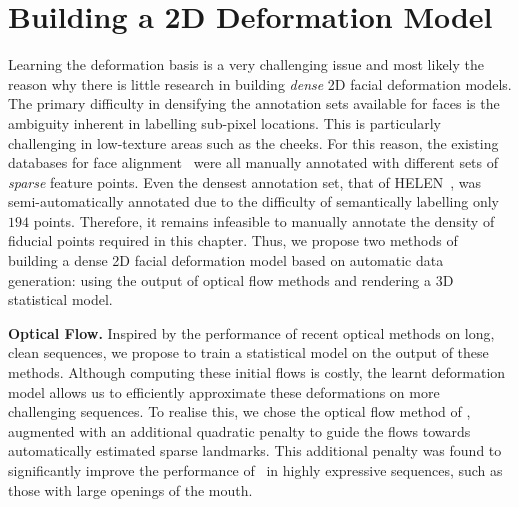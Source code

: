 \section{Building a 2D Deformation Model}\label{sec:face_flow_learning_deformation}
Learning the deformation basis is a very challenging issue and most likely the reason
why there is little research in building \textit{dense} 2D facial deformation models.
The primary difficulty in densifying the annotation sets available for faces
is the ambiguity inherent in labelling sub-pixel locations. This is particularly
challenging in low-texture areas such as the cheeks. For this reason, the 
existing databases for face alignment~\cite{sagonas2013300,zhu2012face,%
belhumeur2013localizing,le2012interactive} were all manually annotated with
different sets of \textit{sparse} feature points. 
Even the densest annotation set, that of HELEN~\cite{le2012interactive}, 
was semi-automatically annotated due to the difficulty of semantically
labelling only $194$ points. Therefore, it remains infeasible to manually
annotate the density of fiducial points required in this chapter. Thus, we
propose two methods of building a dense 2D facial deformation model based
on automatic data generation: using the output of optical flow methods and
rendering a 3D statistical model.

\textbf{Optical Flow.}
Inspired by the performance of recent optical methods on long, clean sequences,
we propose to train a statistical model on the output of these methods. 
Although computing these initial flows is costly, the learnt deformation model
allows us to efficiently approximate these deformations on more challenging
sequences. To realise this, we chose the optical flow method of
\citet{garg2013variational}, augmented with an additional quadratic penalty
to guide the flows towards automatically estimated sparse landmarks.
This additional penalty was found to significantly improve the performance
of~\cite{garg2013variational} in highly expressive sequences, such as those with 
large openings of the mouth.

